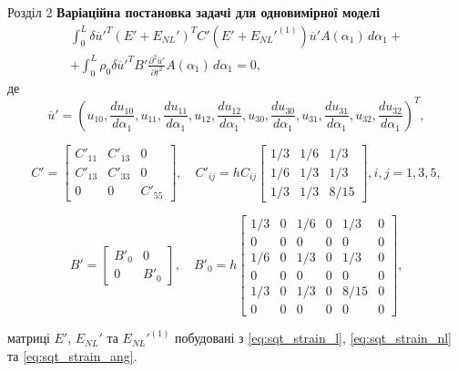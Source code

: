\documentclass[handout, 8pt]{beamer}
\numberwithin{figure}{section}
\numberwithin{equation}{section}
\numberwithin{table}{section}
\begin{document}
\begin{frame}{Розділ 2}
\textbf{Варіаційна постановка задачі для одновимірної моделі}
\begin{multline}
\int_0^L \delta\overline{u}'^T \left( E' + E_{NL}' \right)^T C' \left( E' + E_{NL}'^{(1)} \right)\overline{u}' A\left(\alpha_1\right)\, d\alpha_1+\\+\int_0^L \rho_0 \delta\overline{u}'^T B'\frac{\partial^2 \overline{u}'}{\partial t^2} A\left(\alpha_1\right)\, d\alpha_1=0,
\end{multline}
де
\[
\overline{u}' = \left( u_{10},
\frac { du_{10}} { d \alpha_1},
u_{11},
\frac { du_{11}} { d \alpha_1},
u_{12},
\frac { du_{12}} { d \alpha_1},
u_{30},
\frac { du_{30}} { d \alpha_1},
u_{31},
\frac { du_{31}} { d \alpha_1},
u_{32},
\frac { du_{32}} { d \alpha_1}
\right)^T,
\]


\[
C'=\left[
\begin{array}{ccc}
C'_{11} & C'_{13} & 0 \\ 
C'_{13} & C'_{33} & 0 \\ 
0 & 0 & C'_{55}
\end{array} 
\right], \quad 
C'_{ij}=hC_{ij}\left[
\begin{array}{ccc}
1/3 & 1/6 & 1/3 \\ 
1/6 & 1/3 & 1/3 \\ 
1/3 & 1/3 & 8/15
\end{array} 
\right], i,j=1,3,5,
\]

\[
B'=\left[
\begin{array}{cc}
B'_0 & 0 \\ 
0 & B'_0
\end{array} 
\right], \quad 
B'_0=h\left[
\begin{array}{cccccc}
1/3 & 0 & 1/6 & 0 & 1/3 & 0 \\ 
0 & 0 & 0 & 0 & 0 & 0 \\ 
1/6 & 0 & 1/3 & 0 & 1/3 & 0 \\ 
0 & 0 & 0 & 0 & 0 & 0 \\ 
1/3 & 0 & 1/3 & 0 & 8/15 & 0\\
0 & 0 & 0 & 0 & 0 & 0 
\end{array} 
\right],
\]

матриці $E'$, $E_{NL}'$ та $E_{NL}'^{(1)}$ побудовані з \eqref{eq:sqt_strain_l}, \eqref{eq:sqt_strain_nl} та \eqref{eq:sqt_strain_ang}.

\end{frame}
\end{document}

